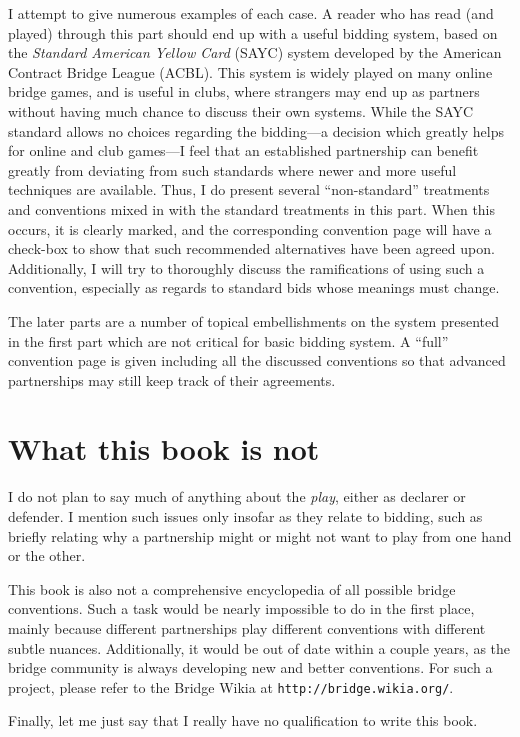 \documentclass[oneside]{memoir}
\begin{document}
I attempt to give numerous examples of each case.
A reader who has read (and played) through this part should end up
with a useful bidding system, based on the \textit{Standard American Yellow Card}
(SAYC) system developed by the American Contract Bridge League (ACBL).  This
system is widely played on many online bridge games, and is useful in clubs,
where strangers may end up as partners without having much chance to discuss
their own systems.  While the SAYC standard allows no choices regarding the
bidding---a decision which greatly helps for online and club games---I feel
that an established partnership can benefit greatly from deviating from such
standards where newer and more useful techniques are available.  Thus, I do
present several ``non-standard'' treatments and conventions mixed in with
the standard treatments in this part.  When this occurs, it is clearly
marked, and the corresponding convention page will have a check-box to show
that such recommended alternatives have been agreed upon.  Additionally,
I will try to thoroughly discuss the ramifications of using such a convention,
especially as regards to standard bids whose meanings must change.

The later parts are a number of topical embellishments on the system
presented in the first part which are not critical for basic bidding system.
A ``full'' convention page is given including all the discussed conventions
so that advanced partnerships may still keep track of their agreements.

\section*{What this book is not}
I do not plan to say much of anything about the \textit{play}, either as
declarer or defender.  I mention such issues only insofar as they relate
to bidding, such as briefly relating why a partnership might or might not
want to play from one hand or the other.

This book is also not a comprehensive encyclopedia of all possible bridge
conventions.  Such a task would be nearly impossible to do in the first
place, mainly because different partnerships play different conventions with
different subtle nuances.  Additionally, it would be out of date within a
couple years, as the bridge community is always developing new and better
conventions.  For such a project, please refer to the Bridge Wikia at 
\verb|http://bridge.wikia.org/|.

Finally, let me just say that I really have no qualification to write this
book.
\end{document}
